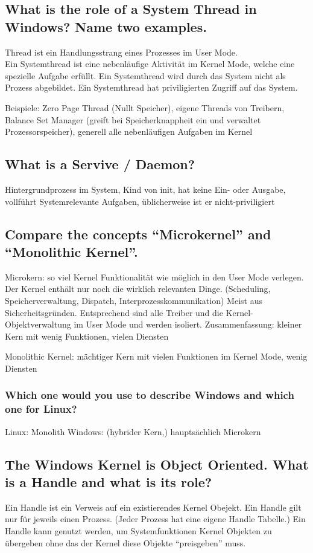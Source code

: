 \subsection{What is the role of a System Thread in Windows? Name two examples.}
Thread ist ein Handlungsstrang eines Prozesses im User Mode. \\
Ein Systemthread ist eine nebenläufige Aktivität im Kernel Mode, welche eine spezielle Aufgabe erfüllt.
Ein Systemthread wird durch das System nicht als Prozess abgebildet.
Ein Systemthread hat priviligierten Zugriff auf das System.

Beispiele: Zero Page Thread (Nullt Speicher), eigene Threads von Treibern, Balance Set Manager (greift bei Speicherknappheit ein und verwaltet Prozessorspeicher), generell alle nebenläufigen Aufgaben im Kernel

\subsection{What is a Servive / Daemon?}
Hintergrundprozess im System, Kind von init, hat keine Ein- oder Ausgabe, vollführt Systemrelevante Aufgaben, üblicherweise ist er nicht-priviligiert

\subsection{Compare the concepts ``Microkernel'' and ``Monolithic Kernel''.}
Microkern: so viel Kernel Funktionalität wie möglich in den User Mode verlegen.
Der Kernel enthält nur noch die wirklich relevanten Dinge. (Scheduling, Speicherverwaltung, Dispatch, Interprozesskommunikation)
Meist aus Sicherheitsgründen.
Entsprechend sind alle Treiber und die Kernel-Objektverwaltung im User Mode und werden isoliert.
Zusammenfassung: kleiner Kern mit wenig Funktionen, vielen Diensten

Monolithic Kernel: mächtiger Kern mit vielen Funktionen im Kernel Mode, wenig Diensten

\subsubsection{Which one would you use to describe Windows and which one for Linux?}
Linux: Monolith
Windows: (hybrider Kern,) hauptsächlich Microkern

\subsection{The Windows Kernel is Object Oriented. What is a Handle and what is its role?}
Ein Handle ist ein Verweis auf ein existierendes Kernel Obejekt.
Ein Handle gilt nur für jeweils einen Prozess. (Jeder Prozess hat eine eigene Handle Tabelle.)
Ein Handle kann genutzt werden, um Systemfunktionen Kernel Objekten zu übergeben ohne das der Kernel diese Objekte ``preisgeben'' muss.

